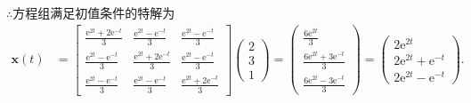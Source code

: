\documentclass[12pt,UTF8]{ctexart}
\newcommand{\me}[0]{\mathrm e}
\begin{document}
\begin{enumerate}
$\therefore$方程组满足初值条件的特解为
\[\begin{aligned}
\bm x(t)&=\begin{bmatrix}\frac{\me^{2t}+2\me^{-t}}3&\frac{\me^{2t}-\me^{-t}}3&\frac{\me^{2t}-\me^{-t}}3\\
\frac{\me^{2t}-\me^{-t}}3&\frac{\me^{2t}+2\me^{-t}}3&\frac{\me^{2t}-\me^{-t}}3\\
\frac{\me^{2t}-\me^{-t}}3&\frac{\me^{2t}-\me^{-t}}3&\frac{\me^{2t}+2\me^{-t}}3
\end{bmatrix}\begin{pmatrix}2\\3\\1\end{pmatrix}=\begin{pmatrix}
\frac{6\me^{2t}}3\\
\frac{6\me^{2t}+3\me^{-t}}3\\
\frac{6\me^{2t}-3\me^{-t}}3
\end{pmatrix}=\begin{pmatrix}
2\me^{2t}\\
2\me^{2t}+\me^{-t}\\
2\me^{2t}-\me^{-t}
\end{pmatrix}.
\end{aligned}\]


\end{enumerate}
\end{document}
